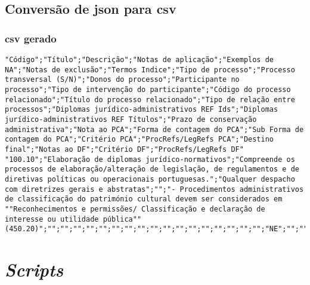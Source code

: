 \section{Conversão de \acrshort{json} para \acrshort{csv}}\label{conv:jsonTOcsv}

\subsection{\acrshort{csv} gerado}
\begin{lstlisting}[language=pseudocode, caption=\acrshort{csv} resultante da conversão do \acrshort{json} presente em~\ref{exem:json}]
"Código";"Título";"Descrição";"Notas de aplicação";"Exemplos de NA";"Notas de exclusão";"Termos Indice";"Tipo de processo";"Processo transversal (S/N)";"Donos do processo";"Participante no processo";"Tipo de intervenção do participante";"Código do processo relacionado";"Título do processo relacionado";"Tipo de relação entre processos";"Diplomas jurídico-administrativos REF Ids";"Diplomas jurídico-administrativos REF Títulos";"Prazo de conservação administrativa";"Nota ao PCA";"Forma de contagem do PCA";"Sub Forma de contagem do PCA";"Critério PCA";"ProcRefs/LegRefs PCA";"Destino final";"Notas ao DF";"Critério DF";"ProcRefs/LegRefs DF"
"100.10";"Elaboração de diplomas jurídico-normativos";"Compreende os processos de elaboração/alteração de legislação, de regulamentos e de diretivas políticas ou operacionais portuguesas.";"Qualquer despacho com diretrizes gerais e abstratas";"";"- Procedimentos administrativos de classificação do património cultural devem ser considerados em ""Reconhecimentos e permissões/ Classificação e declaração de interesse ou utilidade pública"" (450.20)";"";"";"";"";"";"";"";"";"";"";"";"";"";"";"";"";"";"NE";"";"";""
\end{lstlisting}

\chapter{\textit{Scripts}}

